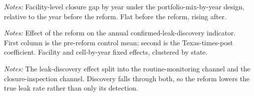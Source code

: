\documentclass[
  12pt,
]{article}
\begin{document}
\clearpage
\null\vfill
\begin{center}
\label{fig-es-fac}
\par\vspace{8pt}
\par\vspace{8pt}
\begin{minipage}{0.85\textwidth}\small\textit{Notes:} Facility-level closure gap by year under the portfolio-mix-by-year design, relative to the year before the reform. Flat before the reform, rising after.\end{minipage}
\end{center}
\vfill\clearpage

\clearpage
\null\vfill
\begin{center}
\label{tbl-leak-did}
\vspace{6pt}
\par\vspace{10pt}
\begin{minipage}{0.85\textwidth}\small\textit{Notes:} Effect of the reform on the annual confirmed-leak-discovery indicator. First column is the pre-reform control mean; second is the Texas-times-post coefficient. Facility and cell-by-year fixed effects, clustered by state.\end{minipage}
\end{center}
\vfill\clearpage

\clearpage
\null\vfill
\begin{center}
\label{tbl-leak-decomp}
\vspace{6pt}
\par\vspace{10pt}
\begin{minipage}{0.85\textwidth}\small\textit{Notes:} The leak-discovery effect split into the routine-monitoring channel and the closure-inspection channel. Discovery falls through both, so the reform lowers the true leak rate rather than only its detection.\end{minipage}
\end{center}
\vfill\clearpage
\end{document}
